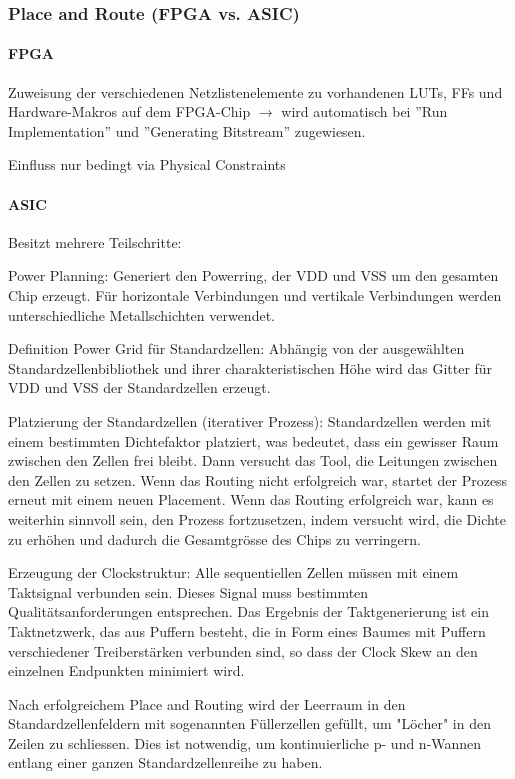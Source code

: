 \subsubsection{Place and Route (FPGA vs. ASIC)}
\paragraph{FPGA}
\begin{compactitem}
        \item Zuweisung der verschiedenen Netzlistenelemente zu vorhandenen LUTs, FFs und Hardware-Makros auf dem FPGA-Chip $\rightarrow$ wird automatisch bei ''Run Implementation'' und ''Generating Bitstream'' zugewiesen. 
        \item Einfluss nur bedingt via Physical Constraints
\end{compactitem}
\paragraph{ASIC}
Besitzt mehrere Teilschritte:
\begin{compactitem}
        \item Power Planning: Generiert den Powerring, der VDD und VSS um den gesamten Chip erzeugt. Für horizontale Verbindungen und vertikale Verbindungen werden unterschiedliche Metallschichten verwendet.
        \item Definition Power Grid für Standardzellen: Abhängig von der ausgewählten Standardzellenbibliothek und ihrer charakteristischen Höhe wird das Gitter für VDD und VSS der Standardzellen erzeugt.
        \item Platzierung der Standardzellen (iterativer Prozess): Standardzellen werden mit einem bestimmten Dichtefaktor platziert, was bedeutet, dass ein gewisser Raum zwischen den Zellen frei bleibt. Dann versucht das Tool, die Leitungen zwischen den Zellen zu setzen. Wenn das Routing nicht erfolgreich war, startet der Prozess erneut mit einem neuen Placement. Wenn das Routing erfolgreich war, kann es weiterhin sinnvoll sein, den Prozess fortzusetzen, indem versucht wird, die Dichte zu erhöhen und dadurch die Gesamtgrösse des Chips zu verringern.
        \item Erzeugung der Clockstruktur: Alle sequentiellen Zellen müssen mit einem Taktsignal verbunden sein. Dieses Signal muss bestimmten Qualitätsanforderungen entsprechen. Das Ergebnis der Taktgenerierung ist ein Taktnetzwerk, das aus Puffern besteht, die in Form eines Baumes mit Puffern verschiedener Treiberstärken verbunden sind, so dass der Clock Skew an den einzelnen Endpunkten minimiert wird.
        \item Nach erfolgreichem Place and Routing wird der Leerraum in den Standardzellenfeldern mit sogenannten Füllerzellen gefüllt, um "Löcher" in den Zeilen zu schliessen. Dies ist notwendig, um kontinuierliche p- und n-Wannen entlang einer ganzen Standardzellenreihe zu haben.
\end{compactitem}
